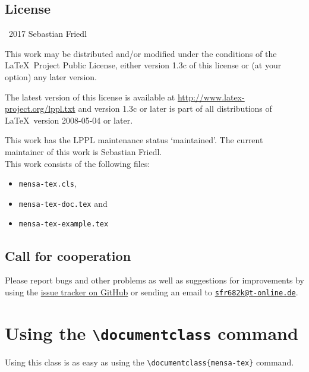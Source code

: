 \documentclass[11pt]{ltxdoc}
\begin{document}
	\subsection*{License}
	\begin{small}
		\textcopyright\ 2017 Sebastian Friedl
		
		\smallskip
		This work may be distributed and/or modified under the conditions of the \LaTeX\ Project Public License, either version 1.3c of this license or (at your option) any later version.
		
		\smallskip
		The latest version of this license is available at \url{http://www.latex-project.org/lppl.txt} and version 1.3c or later is part of all distributions of \LaTeX\ version 2008-05-04 or later.
		
		\smallskip
		This work has the LPPL maintenance status \enquote*{maintained}. The current maintainer of this work is Sebastian Friedl. \\
		This work consists of the following files:
		\begin{itemize} \itemsep 0pt
			\item \texttt{mensa-tex.cls},
			\item \texttt{mensa-tex-doc.tex} and
			\item \texttt{mensa-tex-example.tex}
		\end{itemize}
	\end{small}


	\subsection*{Call for cooperation}
	Please report bugs and other problems as well as suggestions for improvements by using the \href{https://github.com/SFr682k/mensa-tex/issues}{issue tracker on GitHub} or sending an email to \href{mailto:sfr682k@t-online.de}{\texttt{sfr682k@t-online.de}}.


	\clearpage
	
		
		
	
	\section{Using the \texttt{\textbackslash documentclass} command} \label{sec:docclass}
	Using this class is as easy as using the \verb|\documentclass{mensa-tex}| command.
	
\end{document}
